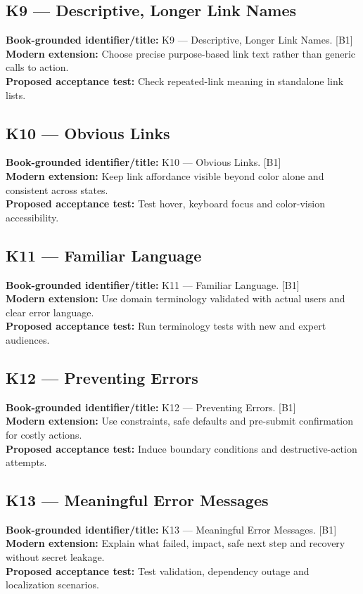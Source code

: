 \documentclass[11pt]{article}
\begin{document}
\subsection{K9 — Descriptive, Longer Link Names}
\noindent\textcolor{Ocean}{\textbf{Book-grounded identifier/title:}} K9 — Descriptive, Longer Link Names. [B1]\\
\textcolor{Mint}{\textbf{Modern extension:}} Choose precise purpose-based link text rather than generic calls to action.\\
\textcolor{Amber}{\textbf{Proposed acceptance test:}} Check repeated-link meaning in standalone link lists.\medskip
\subsection{K10 — Obvious Links}
\noindent\textcolor{Ocean}{\textbf{Book-grounded identifier/title:}} K10 — Obvious Links. [B1]\\
\textcolor{Mint}{\textbf{Modern extension:}} Keep link affordance visible beyond color alone and consistent across states.\\
\textcolor{Amber}{\textbf{Proposed acceptance test:}} Test hover, keyboard focus and color-vision accessibility.\medskip
\subsection{K11 — Familiar Language}
\noindent\textcolor{Ocean}{\textbf{Book-grounded identifier/title:}} K11 — Familiar Language. [B1]\\
\textcolor{Mint}{\textbf{Modern extension:}} Use domain terminology validated with actual users and clear error language.\\
\textcolor{Amber}{\textbf{Proposed acceptance test:}} Run terminology tests with new and expert audiences.\medskip
\subsection{K12 — Preventing Errors}
\noindent\textcolor{Ocean}{\textbf{Book-grounded identifier/title:}} K12 — Preventing Errors. [B1]\\
\textcolor{Mint}{\textbf{Modern extension:}} Use constraints, safe defaults and pre-submit confirmation for costly actions.\\
\textcolor{Amber}{\textbf{Proposed acceptance test:}} Induce boundary conditions and destructive-action attempts.\medskip
\subsection{K13 — Meaningful Error Messages}
\noindent\textcolor{Ocean}{\textbf{Book-grounded identifier/title:}} K13 — Meaningful Error Messages. [B1]\\
\textcolor{Mint}{\textbf{Modern extension:}} Explain what failed, impact, safe next step and recovery without secret leakage.\\
\textcolor{Amber}{\textbf{Proposed acceptance test:}} Test validation, dependency outage and localization scenarios.\medskip
\end{document}
